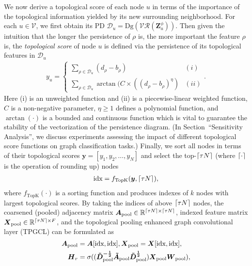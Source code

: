 \documentclass[letterpaper]{article} %
\DeclarePairedDelimiter{\ceil}{\lceil}{\rceil}
\begin{document}
We now derive a topological score of each node $u$ in terms of the importance of the topological information yielded by its new surrounding neighborhood. For each $u\in \mathcal{V}$, we first obtain its PD $\mathcal{D}_u=\text{Dg}(\mathcal{VR}(\boldsymbol{Z}^{\phi}_{u}))$. Then given the intuition that the longer the persistence of $\rho$ is, the more important the feature $\rho$ is, the {\it topological score} of node $u$ is defined via the persistence of its topological features in $\mathcal{D}_u$
\begin{align}
\label{weighting_function}
y_{u} =
\begin{cases}
\sum_{\rho \in \mathcal{D}_u}(d_\rho - b_\rho) & (i)\\
\sum_{\rho \in \mathcal{D}_u}\arctan{(C\times ((d_\rho - b_\rho)^\eta)} & (ii)
\end{cases}.
\end{align}
Here (i) is an unweighted function and (ii) is a piecewise-linear weighted function, $C$ is a non-negative parameter, $\eta \geq 1$ defines a polynomial function, and $\arctan{(\cdot)}$ is a bounded and continuous function which is vital to guarantee the stability of the vectorization of the persistence diagram. (In Section~``Sensitivity Analysis'', we discuss experiments assessing  the impact of different topological score functions on graph classification tasks.) Finally, we sort all nodes in terms of their topological scores
$\boldsymbol{y} = [y_1, y_2, \dots, y_N]$ and select the top-$\ceil{\tau N}$ (where $\ceil{\cdot}$ is the operation of rounding up) nodes
\begin{align}
\text{idx} = f_{\text{TopK}}(\boldsymbol{y}, \ceil{\tau N}),
\end{align}
where $f_{\text{TopK}} (\cdot)$ is a sorting function and produces indexes of $k$ nodes with largest topological scores. By taking the indices of above $\ceil{\tau N}$ nodes, the coarsened (pooled) adjacency matrix $\boldsymbol{A}_{\text{pool}} \in \mathbb{R}^{\ceil{\tau N} \times \ceil{\tau N}}$, indexed feature matrix $\boldsymbol{X}_{\text{pool}} \in \mathbb{R}^{\ceil{\tau N} \times F}$, and the topological pooling enhanced graph convolutional layer (TPGCL) can be formulated as
\begin{align}
\boldsymbol{A}_{\text{pool}} & = \boldsymbol{A}[\text{idx}, \text{idx}], \boldsymbol{X}_{\text{pool}} = \boldsymbol{X}[\text{idx}, \text{idx}],\\
\boldsymbol{H}_r & = \sigma((\boldsymbol{\Tilde{D}^{-\frac{1}{2}}_{\text{pool}}}\boldsymbol{\Tilde{A}_{\text{pool}}}\boldsymbol{\Tilde{D}^{\frac{1}{2}}_{\text{pool}}})\boldsymbol{X}_{\text{pool}}\boldsymbol{W}_{\text{pool}}),
\end{align}
\end{document}
